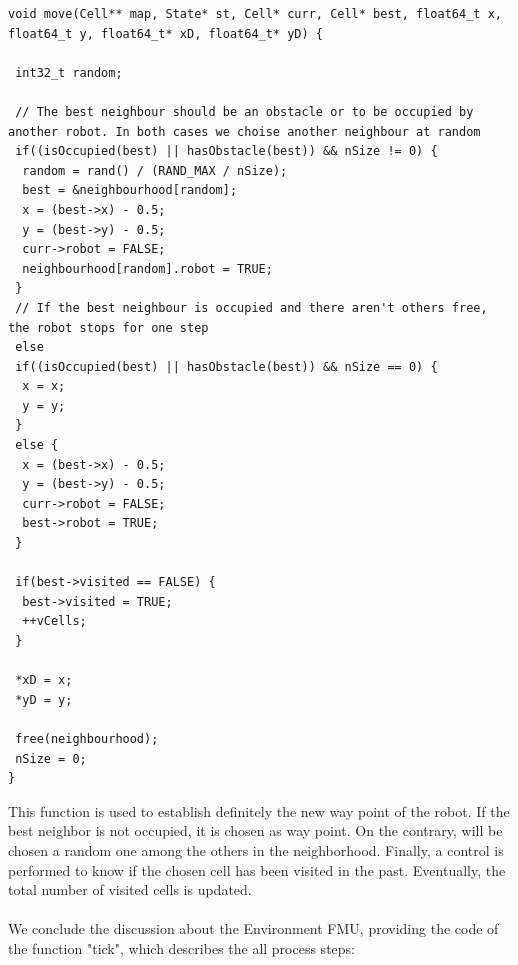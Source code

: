 \documentclass[english]{article}
\begin{document}
\begin{lstlisting}
void move(Cell** map, State* st, Cell* curr, Cell* best, float64_t x, float64_t y, float64_t* xD, float64_t* yD) {

 int32_t random;

 // The best neighbour should be an obstacle or to be occupied by another robot. In both cases we choise another neighbour at random
 if((isOccupied(best) || hasObstacle(best)) && nSize != 0) {
  random = rand() / (RAND_MAX / nSize);
  best = &neighbourhood[random];
  x = (best->x) - 0.5;
  y = (best->y) - 0.5;
  curr->robot = FALSE;
  neighbourhood[random].robot = TRUE;
 }
 // If the best neighbour is occupied and there aren't others free, the robot stops for one step
 else
 if((isOccupied(best) || hasObstacle(best)) && nSize == 0) {
  x = x;
  y = y;
 }
 else {
  x = (best->x) - 0.5;
  y = (best->y) - 0.5;
  curr->robot = FALSE;
  best->robot = TRUE;
 }

 if(best->visited == FALSE) {
  best->visited = TRUE;
  ++vCells;
 }

 *xD = x;
 *yD = y;

 free(neighbourhood);
 nSize = 0;
}
\end{lstlisting}

\noindent This function is used to establish definitely the new way point of the robot. If the best neighbor is not occupied, it is chosen as way point. On the contrary, will be chosen a random one among the others in the neighborhood. Finally, a control is performed to know if the chosen cell has been visited in the past. Eventually, the total number of visited cells is updated.\\
\\ We conclude the discussion about the Environment FMU, providing the code of the function "tick", which describes the all process steps:
\end{document}
